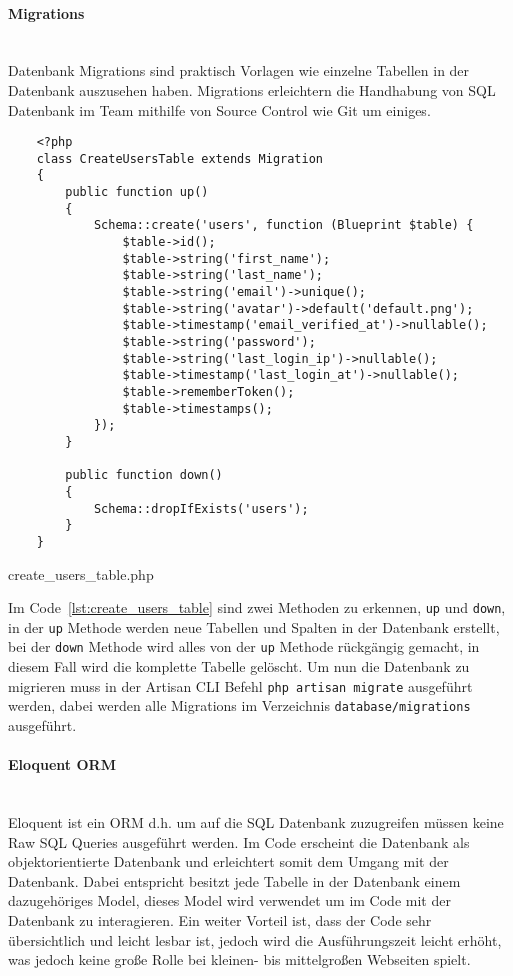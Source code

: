 \paragraph{Migrations}\mbox{}\\
Datenbank Migrations sind praktisch Vorlagen wie einzelne Tabellen in der Datenbank auszusehen
haben. Migrations erleichtern die Handhabung von SQL Datenbank im Team mithilfe
von Source Control wie Git um einiges.

\begin{listing}[H]
  \begin{verbatim}
    <?php
    class CreateUsersTable extends Migration
    {
        public function up()
        {
            Schema::create('users', function (Blueprint $table) {
                $table->id();
                $table->string('first_name');
                $table->string('last_name');
                $table->string('email')->unique();
                $table->string('avatar')->default('default.png');
                $table->timestamp('email_verified_at')->nullable();
                $table->string('password');
                $table->string('last_login_ip')->nullable();
                $table->timestamp('last_login_at')->nullable();
                $table->rememberToken();
                $table->timestamps();
            });
        }
    
        public function down()
        {
            Schema::dropIfExists('users');
        }
    }
  \end{verbatim}
  \caption{create\_users\_table.php}
  \label{lst:create_users_table}
\end{listing}

Im Code~\ref{lst:create_users_table} sind zwei Methoden zu erkennen, \verb|up|
und \verb|down|, in der \verb|up| Methode werden neue Tabellen und Spalten in der
Datenbank erstellt, bei der \verb|down| Methode wird alles von der \verb|up| Methode
rückgängig gemacht, in diesem Fall wird die komplette Tabelle gelöscht. Um nun
die Datenbank zu migrieren muss in der Artisan \acs*{CLI} Befehl \verb|php artisan migrate|
ausgeführt werden, dabei werden alle Migrations im Verzeichnis
\verb|database/migrations| ausgeführt.

\paragraph{Eloquent ORM}\mbox{}\\
Eloquent ist ein \ac*{ORM} d.h. um auf die \acs*{SQL} Datenbank zuzugreifen müssen
keine Raw \acs*{SQL} Queries ausgeführt werden. Im Code erscheint die Datenbank als
objektorientierte Datenbank und erleichtert somit dem Umgang mit der Datenbank.
Dabei entspricht besitzt jede Tabelle in der Datenbank einem dazugehöriges Model,
dieses Model wird verwendet um im Code mit der Datenbank zu interagieren. Ein
weiter Vorteil ist, dass der Code sehr übersichtlich und leicht lesbar ist,
jedoch wird die Ausführungszeit leicht erhöht, was jedoch keine große Rolle bei
kleinen- bis mittelgroßen Webseiten spielt.

